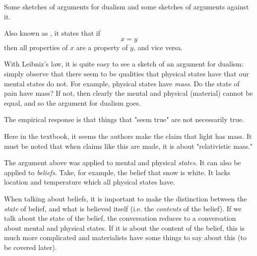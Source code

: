 Some sketches of arguments for dualism and some sketches of arguments against it.

\begin{definition}
    Also known as , it states that if $$x = y$$ then all properties of $x$ are a property of $y$, and vice versa.
\end{definition}

With Leibniz's law, it is quite easy to see a sketch of an argument for dualism: simply observe that there seem to be qualities that physical states have that our mental states do not. For example, physical states have \textit{mass}. Do the state of pain have mass? If not, then clearly the mental and physical (material) cannot be equal, and so the argument for dualism goes.

The empirical response is that things that "seem true" are not necessarily true.
\begin{remark}
    Here in the textbook, it seems the authors make the claim that light has mass. It must be noted that when claims like this are made, it is about "relativistic mass."
\end{remark}

The argument above was applied to mental and physical \textit{states}. It can also be applied to \textit{beliefs}. Take, for example, the belief that snow is white. It lacks location and temperature which all physical states have.

When talking about beliefs, it is important to make the distinction  between the \textit{state} of belief, and what is believed itself (i.e. the \textit{contents} of the belief). If we talk about the state of the belief, the conversation reduces to a conversation about mental and physical states. If it is about the content of the belief, this is much more complicated and materialists have some things to say about this (to be covered later).


